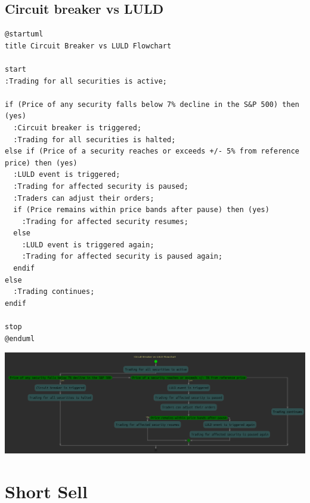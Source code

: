 \documentclass[11pt]{article}
\begin{document}
\subsection{Circuit breaker vs LULD}
\label{sec:org4877dbb}
\begin{verbatim}
@startuml
title Circuit Breaker vs LULD Flowchart

start
:Trading for all securities is active;

if (Price of any security falls below 7% decline in the S&P 500) then (yes)
  :Circuit breaker is triggered;
  :Trading for all securities is halted;
else if (Price of a security reaches or exceeds +/- 5% from reference price) then (yes)
  :LULD event is triggered;
  :Trading for affected security is paused;
  :Traders can adjust their orders;
  if (Price remains within price bands after pause) then (yes)
    :Trading for affected security resumes;
  else
    :LULD event is triggered again;
    :Trading for affected security is paused again;
  endif
else
  :Trading continues;
endif

stop
@enduml
\end{verbatim}
\begin{center}
\includegraphics[width=.9\linewidth]{./CircuitBreaker_VS_LULD.png}
\end{center}

\section{Short Sell}
\label{sec:orgdeb2147}
\end{document}
